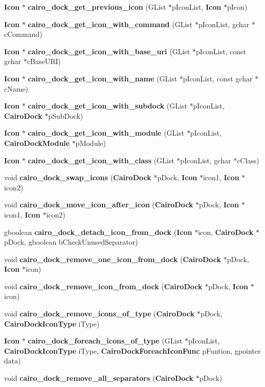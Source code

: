 \begin{CompactItemize}
\item 
{\bf Icon} $\ast$ {\bf cairo\_\-dock\_\-get\_\-previous\_\-icon} (GList $\ast$pIconList, {\bf Icon} $\ast$pIcon)
\item 
{\bf Icon} $\ast$ {\bf cairo\_\-dock\_\-get\_\-icon\_\-with\_\-command} (GList $\ast$pIconList, gchar $\ast$cCommand)
\item 
{\bf Icon} $\ast$ {\bf cairo\_\-dock\_\-get\_\-icon\_\-with\_\-base\_\-uri} (GList $\ast$pIconList, const gchar $\ast$cBaseURI)
\item 
{\bf Icon} $\ast$ {\bf cairo\_\-dock\_\-get\_\-icon\_\-with\_\-name} (GList $\ast$pIconList, const gchar $\ast$cName)
\item 
{\bf Icon} $\ast$ {\bf cairo\_\-dock\_\-get\_\-icon\_\-with\_\-subdock} (GList $\ast$pIconList, {\bf CairoDock} $\ast$pSubDock)
\item 
{\bf Icon} $\ast$ {\bf cairo\_\-dock\_\-get\_\-icon\_\-with\_\-module} (GList $\ast$pIconList, {\bf CairoDockModule} $\ast$pModule)
\item 
{\bf Icon} $\ast$ {\bf cairo\_\-dock\_\-get\_\-icon\_\-with\_\-class} (GList $\ast$pIconList, gchar $\ast$cClass)
\item 
void {\bf cairo\_\-dock\_\-swap\_\-icons} ({\bf CairoDock} $\ast$pDock, {\bf Icon} $\ast$icon1, {\bf Icon} $\ast$icon2)
\item 
void {\bf cairo\_\-dock\_\-move\_\-icon\_\-after\_\-icon} ({\bf CairoDock} $\ast$pDock, {\bf Icon} $\ast$icon1, {\bf Icon} $\ast$icon2)
\item 
gboolean {\bf cairo\_\-dock\_\-detach\_\-icon\_\-from\_\-dock} ({\bf Icon} $\ast$icon, {\bf CairoDock} $\ast$pDock, gboolean bCheckUnusedSeparator)
\item 
void {\bf cairo\_\-dock\_\-remove\_\-one\_\-icon\_\-from\_\-dock} ({\bf CairoDock} $\ast$pDock, {\bf Icon} $\ast$icon)
\item 
void {\bf cairo\_\-dock\_\-remove\_\-icon\_\-from\_\-dock} ({\bf CairoDock} $\ast$pDock, {\bf Icon} $\ast$icon)
\item 
void {\bf cairo\_\-dock\_\-remove\_\-icons\_\-of\_\-type} ({\bf CairoDock} $\ast$pDock, {\bf CairoDockIconType} iType)
\item 
{\bf Icon} $\ast$ {\bf cairo\_\-dock\_\-foreach\_\-icons\_\-of\_\-type} (GList $\ast$pIconList, {\bf CairoDockIconType} iType, {\bf CairoDockForeachIconFunc} pFuntion, gpointer data)
\item 
void {\bf cairo\_\-dock\_\-remove\_\-all\_\-separators} ({\bf CairoDock} $\ast$pDock)
\item 

\end{CompactItemize}
